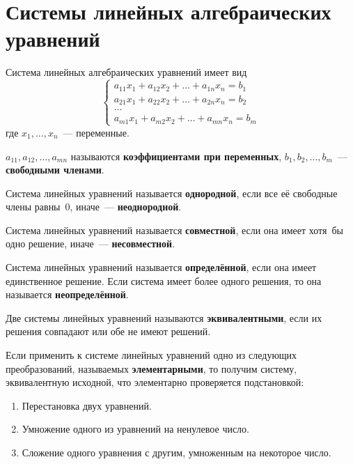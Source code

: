 \section{Системы линейных алгебраических уравнений}
Система линейных алгебраических уравнений имеет вид
\begin{equation*}
\begin{cases}
a_{11} x_1 + a_{12} x_2 + \dots + a_{1n} x_n = b_1 \\
a_{21} x_1 + a_{22} x_2 + \dots + a_{2n} x_n = b_2 \\
\ldots \\
a_{m1} x_1 + a_{m2} x_2 + \dots + a_{mn} x_n = b_m
\end{cases}
\end{equation*}
где $x_1, \ldots, x_n$~--- переменные.

$a_{11}, a_{12}, \ldots, a_{mn}$ называются \textbf{коэффициентами при переменных}, $b_1, b_2, \dots, b_m$~--- \textbf{свободными членами}.

Система линейных уравнений называется \textbf{однородной}, если все её свободные члены равны~$0$, иначе~--- \textbf{неоднородной}.

Система линейных уравнений называется \textbf{совместной}, если она имеет хотя~бы одно решение, иначе~--- \textbf{несовместной}.

Система линейных уравнений называется \textbf{определённой}, если она имеет единственное решение.
Если система имеет более одного решения, то она называется \textbf{неопределённой}.

Две системы линейных уравнений называются \textbf{эквивалентными}, если их решения совпадают или обе не имеют решений.

Если применить к системе линейных уравнений одно из следующих преобразований, называемых \textbf{элементарными}, то получим систему, эквивалентную исходной, что элементарно проверяется подстановкой:
\begin{enumerate}
	\item Перестановка двух уравнений.
	\item Умножение одного из уравнений на ненулевое число.
	\item Сложение одного уравнения с другим, умноженным на некоторое число.
\end{enumerate}